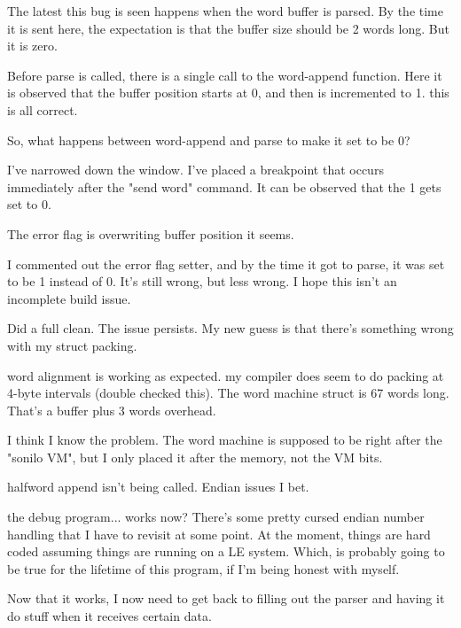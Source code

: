 The latest this bug is seen happens when the word buffer is parsed. By the time it is sent here, the expectation is that the buffer size should be 2 words long. But it is zero.
\par

Before parse is called, there is a single call to the word-append function. Here it is observed that the buffer position starts at 0, and then is incremented to 1. this is all correct.
\par

So, what happens between word-append and parse to make it set to be 0?
\par

I've narrowed down the window. I've placed a breakpoint that occurs immediately after the "send word" command. It can be observed that the 1 gets set to 0.
\par

The error flag is overwriting buffer position it seems.
\par

I commented out the error flag setter, and by the time it got to parse, it was set to be 1 instead of 0. It's still wrong, but less wrong. I hope this isn't an incomplete build issue.
\par

Did a full clean. The issue persists. My new guess is that there's something wrong with my struct packing.
\par

word alignment is working as expected. my compiler does seem to do packing at 4-byte intervals (double checked this). The word machine struct is 67 words long. That's a buffer plus 3 words overhead.
\par

I think I know the problem. The word machine is supposed to be right after the "sonilo VM", but I only placed it after the memory, not the VM bits.
\par

halfword append isn't being called. Endian issues I bet.
\par

the debug program... works now? There's some pretty cursed endian number handling that I have to revisit at some point. At the moment, things are hard coded assuming things are running on a LE system. Which, is probably going to be true for the lifetime of this program, if I'm being honest with myself.
\par

Now that it works, I now need to get back to filling out the parser and having it do stuff when it receives certain data.
\par


